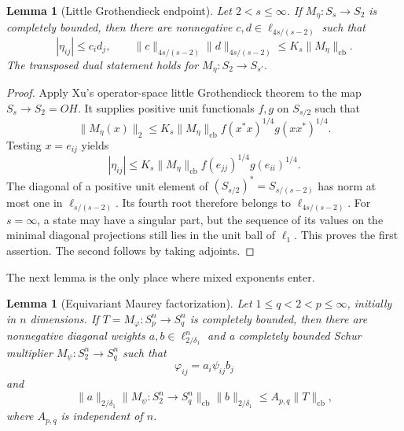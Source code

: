 \documentclass[11pt]{article}
\newtheorem{lemma}[theorem]{Lemma}
\newcommand{\cb}{\mathrm{cb}}
\begin{document}
\begin{lemma}[Little Grothendieck endpoint]
\label{lem:endpoint}
Let $2<s\le\infty$.  If $M_\eta:S_s\to S_2$ is completely bounded, then
there are nonnegative $c,d\in\ell_{4s/(s-2)}$ such that
\[
 |\eta_{ij}|\le c_i d_j,
 \qquad
 \|c\|_{4s/(s-2)}\|d\|_{4s/(s-2)}
 \le K_s\|M_\eta\|_{\cb}.
\]
The transposed dual statement holds for $M_\eta:S_2\to S_{s'}$.
\end{lemma}

\begin{proof}
Apply Xu's operator-space little Grothendieck theorem
\cite[Corollary 7.2]{Xu} to the map $S_s\to S_2=OH$.  It supplies positive
unit functionals $f,g$ on $S_{s/2}$ such that
\[
 \|M_\eta(x)\|_2
 \le K_s\|M_\eta\|_{\cb}
       f(x^*x)^{1/4}g(xx^*)^{1/4}.
\]
Testing $x=e_{ij}$ yields
\[
 |\eta_{ij}|\le K_s\|M_\eta\|_{\cb}
 f(e_{jj})^{1/4}g(e_{ii})^{1/4}.
\]
The diagonal of a positive unit element of
$(S_{s/2})^*=S_{s/(s-2)}$ has norm at most one in
$\ell_{s/(s-2)}$.  Its fourth root therefore belongs to
$\ell_{4s/(s-2)}$.  For $s=\infty$, a state may have a singular part, but
the sequence of its values on the minimal diagonal projections still lies in
the unit ball of $\ell_1$.  This proves the first assertion.  The second
follows by taking adjoints.
\end{proof}

The next lemma is the only place where mixed exponents enter.

\begin{lemma}[Equivariant Maurey factorization]
\label{lem:equivariant}
Let $1\le q<2<p\le\infty$, initially in $n$ dimensions.  If
$T=M_\varphi:S_p^n\to S_q^n$ is completely bounded, then there are
nonnegative diagonal weights $a,b\in\ell_{2/\delta_1}^n$ and a completely
bounded Schur multiplier $M_\psi:S_2^n\to S_q^n$ such that
\begin{equation}\label{eq:maurey-factor}
 \varphi_{ij}=a_i\psi_{ij}b_j
\end{equation}
and
\begin{equation}\label{eq:maurey-bound}
 \|a\|_{2/\delta_1}\|M_\psi:S_2^n\to S_q^n\|_{\cb}
 \|b\|_{2/\delta_1}
 \le A_{p,q}\|T\|_{\cb},
\end{equation}
where $A_{p,q}$ is independent of $n$.
\end{lemma}
\end{document}
